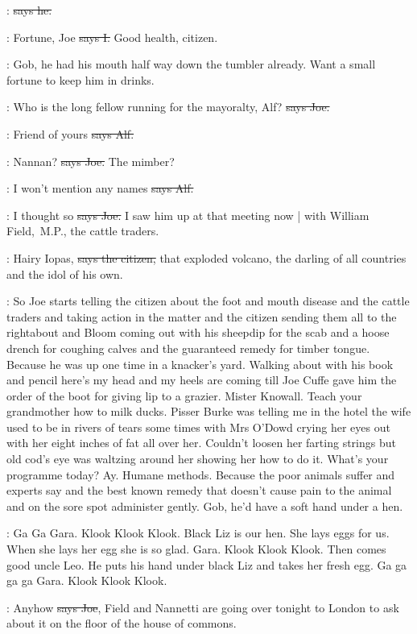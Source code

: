 \citizen:
\sout{says he.}

:
Fortune,
Joe
\sout{says I.}
Good health,
citizen.

\Nq:
Gob,
he had his mouth half way down the tumbler already.
Want a
small fortune to keep him in drinks.

\joe:
Who is the long fellow running for the mayoralty,
Alf?
\sout{says Joe.}

\bergan:
Friend of yours
\sout{says Alf.}

\joe:
Nannan?
\sout{says Joe.} The mimber?

\bergan:
I won't mention any names
\sout{says Alf.}

\joe:
I thought so
\sout{says Joe.}
I saw him up at that meeting now |
with William Field,~M.P.,
the cattle traders.

\citizen:
Hairy Iopas,
\sout{says the citizen,}
that exploded volcano,
the darling of all
countries
and the idol of his own.

\Nq:
So Joe starts telling the citizen about the foot and mouth disease and
the cattle traders and taking action in the matter and the citizen sending
them all to the rightabout and Bloom coming out with his sheepdip for the
scab and a hoose drench for coughing calves and the guaranteed remedy
for timber tongue.
Because he was up one time in a knacker's yard.
Walking about with his book and pencil here's my head and my heels are
coming till Joe Cuffe gave him the order of the boot for giving lip to a
grazier.
Mister Knowall.
Teach your grandmother how to milk ducks.
Pisser Burke was telling me in the hotel the wife used to be in rivers of
tears some times with Mrs O'Dowd crying her eyes out
with her eight inches
of fat all over her.
Couldn't loosen her farting strings but old cod's eye
was waltzing around her showing her how to do it.
What's your programme
today?
Ay.
Humane methods.
Because the poor animals suffer and experts
say and the best known remedy that doesn't cause pain to the animal and
on the sore spot administer gently.
Gob,
he'd have a soft hand under a
hen.

:
Ga Ga Gara.
Klook Klook Klook.
Black Liz is our hen.
She lays eggs
for us.
When she lays her egg she is so glad.
Gara.
Klook Klook Klook.
Then comes good uncle Leo.
He puts his hand under black Liz and takes
her fresh egg.
Ga ga ga ga Gara.
Klook Klook Klook.

\joe:
Anyhow
\sout{says Joe},
Field and Nannetti are going over tonight to London
to ask about it on the floor of the house of commons.

